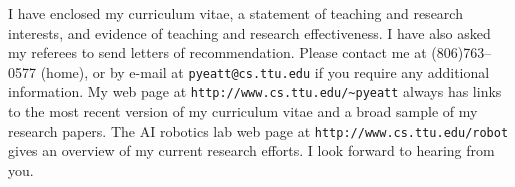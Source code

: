 I have enclosed my curriculum vitae, a statement of teaching and research
interests, and evidence of teaching and research effectiveness.  I have also
asked my referees to send letters of recommendation.  Please contact me at
(806)763--0577 (home), or by e-mail at {\verb!pyeatt@cs.ttu.edu!} if you
require any additional information.  My web page at
\verb!http://www.cs.ttu.edu/~pyeatt!  always has links to the most recent
version of my curriculum vitae and a broad sample of my research papers. The
AI robotics lab web page at \verb!http://www.cs.ttu.edu/robot!  gives an
overview of my current research efforts.  I look forward to hearing from
you.



